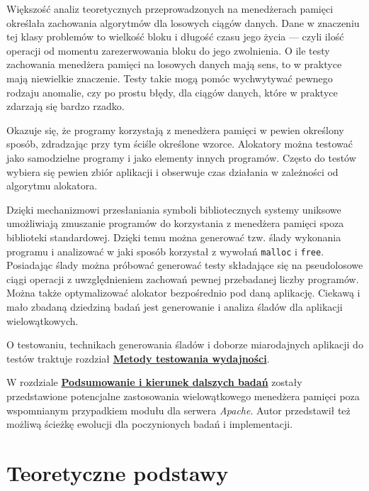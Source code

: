 \documentclass[12pt,a4paper,titlepage,twoside]{mwart}
\begin{document}
Większość analiz teoretycznych przeprowadzonych na menedżerach pamięci
określała zachowania algorytmów dla losowych ciągów danych. Dane w znaczeniu
tej klasy problemów to wielkość bloku i długość czasu jego życia --- czyli ilość
operacji od momentu zarezerwowania bloku do jego zwolnienia. O ile testy
zachowania menedżera pamięci na losowych danych mają sens, to w praktyce mają
niewielkie znaczenie. Testy takie mogą pomóc wychwytywać pewnego rodzaju
anomalie, czy po prostu błędy, dla ciągów danych, które w praktyce zdarzają się
bardzo rzadko.

Okazuje się, że programy korzystają z menedżera pamięci w pewien określony
sposób, zdradzając przy tym ściśle określone wzorce. Alokatory można testować
jako samodzielne programy i jako elementy innych programów. Często do testów
wybiera się pewien zbiór aplikacji i obserwuje czas działania w zależności od
algorytmu alokatora.

Dzięki mechanizmowi przesłaniania symboli bibliotecznych systemy uniksowe
umożliwiają zmuszanie programów do korzystania z menedżera pamięci spoza
biblioteki standardowej. Dzięki temu można generować tzw. ślady wykonania
programu i analizować w jaki sposób korzystał z wywołań \texttt{malloc} i
\texttt{free}. Posiadając ślady można próbować generować testy składające się
na pseudolosowe ciągi operacji z uwzględnieniem zachowań pewnej przebadanej
liczby programów. Można także optymalizować alokator bezpośrednio pod daną
aplikację. Ciekawą i mało zbadaną dziedziną badań jest generowanie i analiza
śladów dla aplikacji wielowątkowych.

O testowaniu, technikach generowania śladów i doborze miarodajnych aplikacji do
testów traktuje rozdział \hyperlink{Testowanie}{\textbf{Metody testowania
wydajności}}.

W rozdziale \hyperlink{Podsumowanie}{\textbf{Podsumowanie i kierunek dalszych
badań}} zostały przedstawione potencjalne zastosowania wielowątkowego menedżera
pamięci poza wspomnianym przypadkiem modułu dla serwera \textit{Apache}. Autor
przedstawił też możliwą ścieżkę ewolucji dla poczynionych badań i
implementacji.

\newpage


\section{Teoretyczne podstawy}
\hypertarget{Teoria}{}
\end{document}
